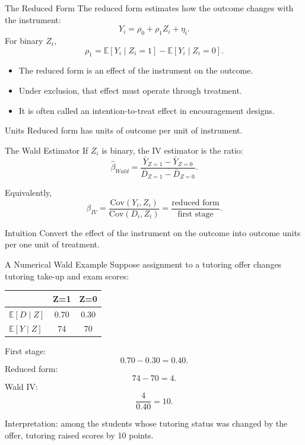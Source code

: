 \documentclass[11pt,aspectratio=169]{beamer}
\newcommand{\E}{\mathbb{E}}
\newcommand{\Cov}{\mathrm{Cov}}
\newcommand{\derivbutton}[1]{\vspace{0.4em}\hfill\hyperlink{app:#1}{\beamerbutton{Appendix details}}}
\begin{document}
\begin{frame}{The Reduced Form}
  The reduced form estimates how the outcome changes with the instrument:
  \[
    Y_i = \rho_0 + \rho_1 Z_i + \eta_i.
  \]
  For binary \(Z_i\),
  \[
    \rho_1 = \E[Y_i\mid Z_i=1]-\E[Y_i\mid Z_i=0].
  \]

  \begin{itemize}
    \item The reduced form is an effect of the instrument on the outcome.
    \item Under exclusion, that effect must operate through treatment.
    \item It is often called an intention-to-treat effect in encouragement designs.
  \end{itemize}

  \begin{block}{Units}
    Reduced form has units of outcome per unit of instrument.
  \end{block}
\end{frame}

\begin{frame}{The Wald Estimator}
  \hypertarget{main:wald}{}
  If \(Z_i\) is binary, the IV estimator is the ratio:
  \[
    \hat{\beta}_{Wald}
    =
    \frac{\bar{Y}_{Z=1}-\bar{Y}_{Z=0}}
         {\bar{D}_{Z=1}-\bar{D}_{Z=0}}.
  \]

  Equivalently,
  \[
    \beta_{IV}
    =
    \frac{\Cov(Y_i,Z_i)}{\Cov(D_i,Z_i)}
    =
    \frac{\text{reduced form}}{\text{first stage}}.
  \]

  \begin{block}{Intuition}
    Convert the effect of the instrument on the outcome into outcome units per one unit of treatment.
  \end{block}

  \derivbutton{wald-proof}
\end{frame}

\begin{frame}{A Numerical Wald Example}
  Suppose assignment to a tutoring offer changes tutoring take-up and exam scores:
  \begin{center}
  \begin{tabular}{lcc}
    \toprule
    & Z=1 & Z=0 \\
    \midrule
    \(\E[D\mid Z]\) & 0.70 & 0.30 \\
    \(\E[Y\mid Z]\) & 74 & 70 \\
    \bottomrule
  \end{tabular}
  \end{center}

  First stage:
  \[
    0.70-0.30=0.40.
  \]
  Reduced form:
  \[
    74-70=4.
  \]
  Wald IV:
  \[
    \frac{4}{0.40}=10.
  \]

  Interpretation: among the students whose tutoring status was changed by the offer, tutoring raised scores by 10 points.
\end{frame}
\end{document}
